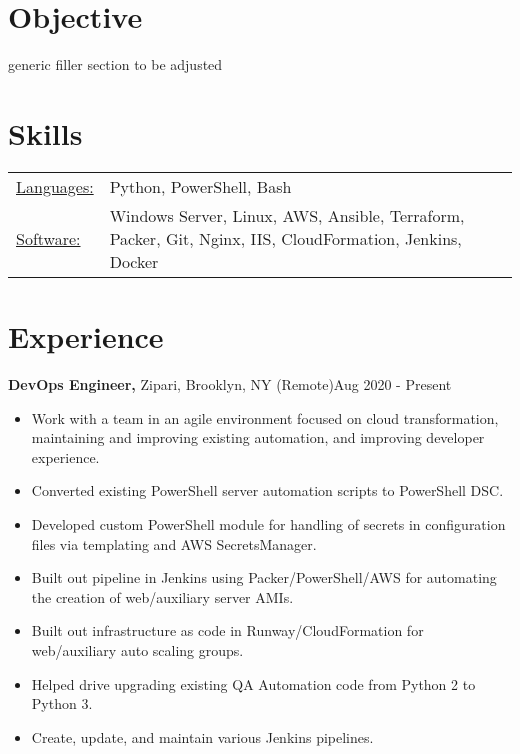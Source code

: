 \documentclass[margin]{res}
\begin{document}
 
 
 
\address{{\bf Contact Information} \\ Email: sdixon@posteo.net \\ Phone: (317) 450-8066}
\address{{\bf Socials} \\ Github: https://github.com/samdixon \\ Website: https://sjd.im \\
        }

\begin{resume} 
 
\section{Objective} 
generic filler section to be adjusted

\section{Skills}
   \begin{tabular}{l p{3in}}
    \underline{Languages:} & Python, PowerShell, Bash \\

     \underline{Software:} & Windows Server, Linux, AWS, Ansible, Terraform, Packer,
                            Git, Nginx, IIS, CloudFormation, Jenkins, Docker
 \end{tabular}

 

\section{Experience}
    {\bf DevOps Engineer,} Zipari, Brooklyn, NY (Remote)\hfill Aug 2020 - Present
 \begin{itemize} \itemsep -2pt  %
 \item Work with a team in an agile environment focused on cloud transformation, maintaining and improving existing automation, and improving developer experience.
 \item Converted existing PowerShell server automation scripts to PowerShell DSC.
 \item Developed custom PowerShell module for handling of secrets in configuration files via templating and AWS SecretsManager.
 \item Built out pipeline in Jenkins using Packer/PowerShell/AWS for automating the creation of web/auxiliary server AMIs. 
 \item Built out infrastructure as code in Runway/CloudFormation for web/auxiliary auto scaling groups.
 \item Helped drive upgrading existing QA Automation code from Python 2 to Python 3.
 \item Create, update, and maintain various Jenkins pipelines.
 \end{itemize}


\end{resume}
\end{document}

